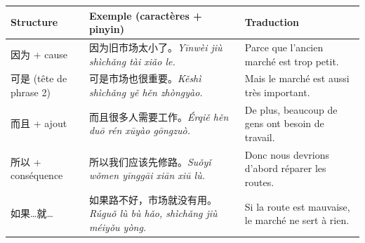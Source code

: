 \documentclass[11pt]{article}
\begin{document}
\begin{center}
\begin{tabularx}{\linewidth}{|X|X|X|}
\hline
\rowcolor{popblueL} Structure & Exemple (caractères + pinyin) & Traduction \\
\hline
因为 + cause & 因为旧市场太小了。\newline \emph{Yīnwèi jiù shìchǎng tài xiǎo le.} & Parce que l'ancien marché est trop petit. \\
\hline
可是 (tête de phrase 2) & 可是市场也很重要。\newline \emph{Kěshì shìchǎng yě hěn zhòngyào.} & Mais le marché est aussi très important. \\
\hline
而且 + ajout & 而且很多人需要工作。\newline \emph{Érqiě hěn duō rén xūyào gōngzuò.} & De plus, beaucoup de gens ont besoin de travail. \\
\hline
所以 + conséquence & 所以我们应该先修路。\newline \emph{Suǒyǐ wǒmen yīnggāi xiān xiū lù.} & Donc nous devrions d'abord réparer les routes. \\
\hline
如果…就… & 如果路不好，市场就没有用。\newline \emph{Rúguǒ lù bù hǎo, shìchǎng jiù méiyǒu yòng.} & Si la route est mauvaise, le marché ne sert à rien. \\
\hline
\end{tabularx}
\end{center}
\end{document}
